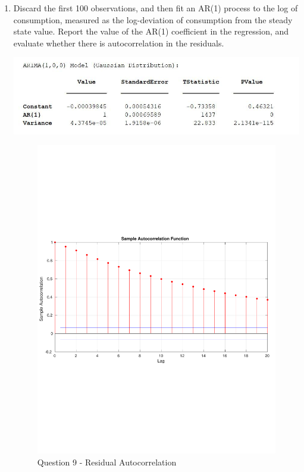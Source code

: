 \documentclass[11pt]{article}
\begin{document}
\begin{enumerate}
\newpage
\item Discard the first 100 observations, and then fit an AR(1) process to the
log of consumption, measured as the log-deviation of consumption from the
steady state value. Report the value of the AR(1) coefficient in the regression,
and evaluate whether there is autocorrelation in the residuals.



\begin{center}
\includegraphics[scale=0.75]{MacroHW2_Q9.JPG}
\end{center}

\begin{figure}[htp]
\begin{center}
\includegraphics[width=\textwidth, keepaspectratio=true]{Q9_ResidualAutocorrelationPlot.pdf}
\caption{Question 9 - Residual Autocorrelation}
\end{center}
\end{figure}


\end{enumerate}
\end{document}
